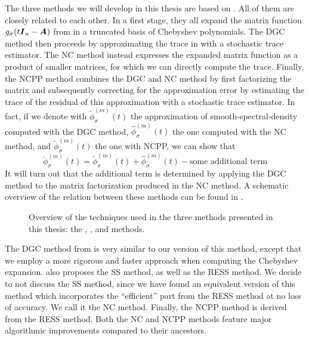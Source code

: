 The three methods we will develop in this thesis are based on \cite{lin2017randomized}.
All of them are closely related to each other. In a first stage, they all expand the matrix
function $g_{\sigma}(t\boldsymbol{I}_n - \boldsymbol{A})$ from
 in a truncated basis of
Chebyshev polynomials. The \gls{DGC} method then proceeds by approximating the
trace in  with a stochastic
trace estimator. The \gls{NC} method instead expresses the expanded matrix function
as a product of smaller matrices, for which we can directly compute the trace.
Finally, the \gls{NCPP} method combines the \gls{DGC} and \gls{NC} method
by first factorizing the matrix and subsequently correcting for the approximation
error by estimating the trace of the residual of this approximation with a stochastic trace estimator.
In fact, if we denote with $\widetilde{\phi}_{\sigma}^{(m)}(t)$ the approximation
of \gls{smooth-spectral-density} computed with the \gls{DGC} method, $\widehat{\phi}_{\sigma}^{(m)}(t)$ the
one computed with the \gls{NC} method, and $\breve{\phi}_{\sigma}^{(m)}(t)$ the one
with \gls{NCPP}, we can show that
\begin{equation}
    \breve{\phi}_{\sigma}^{(m)}(t) = \widetilde{\phi}_{\sigma}^{(m)}(t) + \widehat{\phi}_{\sigma}^{(m)}(t) - \text{some additional term}
    \label{equ:1-introduction-relation-methods}
\end{equation}
It will turn out that the additional term is determined by applying
the \gls{DGC} method to the matrix factorization produced in the \gls{NC} method.
A schematic overview of the relation between these methods can be found
in .

\begin{figure}[ht]
    \centering
    
    \caption{Overview of the techniques used in the three methods presented
    in this thesis: the , , and  methods.}
    \label{fig:1-introduction-methods-overview}
\end{figure}

The \gls{DGC} method from \cite{lin2017randomized} is very similar to our version
of this method, except that we employ a more rigorous and faster approach when
computing the Chebyshev expansion. \cite{lin2017randomized} also proposes the
\gls{SS} method, as well as the \gls{RESS} method. We decide to not discuss the
\gls{SS} method, since we have found an equivalent version of this method which
incorporates the \enquote{efficient} part from the \gls{RESS} method at no loss
of accuracy. We call it the \gls{NC} method.
Finally, the \gls{NCPP} method is derived from the \gls{RESS} method. Both the
\gls{NC} and \gls{NCPP} methods feature major algorithmic improvements compared
to their ancestors.

